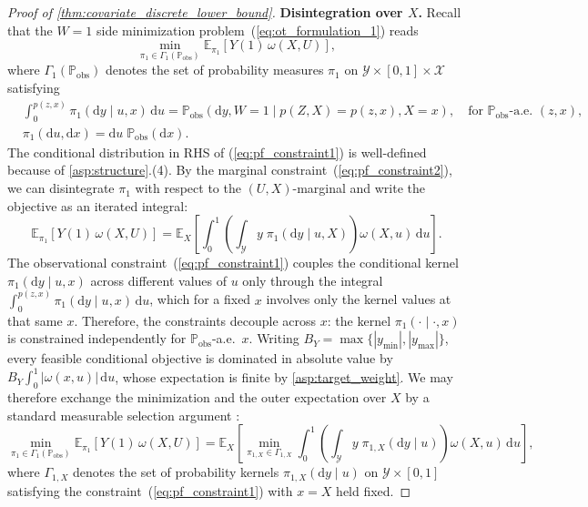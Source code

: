 \begin{proof}[Proof of \cref{thm:covariate_discrete_lower_bound}]
\medskip
\noindent\textbf{Disintegration over $X$.}
Recall that the $W=1$ side minimization problem~(\ref{eq:ot_formulation_1}) reads
\begin{equation*}
    \min_{\pi_1 \in \Gamma_1(\mathbb{P}_{\text{obs}})} \mathbb{E}_{\pi_1}[Y(1)\,\omega(X,U)],
\end{equation*}
where $\Gamma_1(\mathbb{P}_{\text{obs}})$ denotes the set of probability measures $\pi_1$ on $\mathcal{Y} \times [0,1] \times \mathcal{X}$ satisfying
\begin{align}
    &\int_0^{p(z,x)} \pi_1(\mathrm{d}y \mid u, x)\,\mathrm{d}u = \mathbb{P}_{\text{obs}}(\mathrm{d}y, W\!=\!1 \mid p(Z,X)\!=\!p(z,x), X\!=\!x), \quad \text{for } \mathbb{P}_{\text{obs}}\text{-a.e.\ } (z,x), \label{eq:pf_constraint1} \\
    &\pi_1(\mathrm{d}u, \mathrm{d}x) = \mathrm{d}u\;\mathbb{P}_{\text{obs}}(\mathrm{d}x). \label{eq:pf_constraint2}
\end{align}
The conditional distribution in RHS of (\ref{eq:pf_constraint1}) is well-defined because of \cref{asp:structure}.(4). By the marginal constraint~(\ref{eq:pf_constraint2}), we can disintegrate $\pi_1$ with respect to the $(U,X)$-marginal and write the objective as an iterated integral:
\begin{equation}\label{eq:pf_iterated}
    \mathbb{E}_{\pi_1}[Y(1)\,\omega(X,U)] = \mathbb{E}_{X}\left[\int_0^1 \left(\int_{\mathcal{Y}} y\;\pi_1(\mathrm{d}y \mid u, X)\right) \omega(X,u)\,\mathrm{d}u\right].
\end{equation}
The observational constraint~(\ref{eq:pf_constraint1}) couples the conditional kernel $\pi_1(\mathrm{d}y \mid u, x)$ across different values of $u$ only through the integral $\int_0^{p(z,x)} \pi_1(\mathrm{d}y \mid u, x)\,\mathrm{d}u$, which for a fixed $x$ involves only the kernel values at that same $x$. Therefore, the constraints decouple across $x$: the kernel $\pi_1(\cdot \mid \cdot, x)$ is constrained independently for $\mathbb{P}_{\text{obs}}$-a.e.\ $x$. Writing $B_Y=\max\{|y_{\min}|,|y_{\max}|\}$, every feasible conditional objective is dominated in absolute value by $B_Y\int_0^1|\omega(x,u)|\,\mathrm du$, whose expectation is finite by \cref{asp:target_weight}. We may therefore exchange the minimization and the outer expectation over $X$ by a standard measurable selection argument \citep[Proposition 7.50]{bertsekas1996stochastic}:
\begin{equation}\label{eq:pf_exchange}
    \min_{\pi_1 \in \Gamma_1(\mathbb{P}_{\text{obs}})} \mathbb{E}_{\pi_1}[Y(1)\,\omega(X,U)] = \mathbb{E}_{X}\left[\min_{\pi_{1,X} \in \Gamma_{1,X}} \int_0^1 \left(\int_{\mathcal{Y}} y\;\pi_{1,X}(\mathrm{d}y \mid u)\right) \omega(X,u)\,\mathrm{d}u\right],
\end{equation}
where $\Gamma_{1,X}$ denotes the set of probability kernels $\pi_{1,X}(\mathrm{d}y \mid u)$ on $\mathcal{Y} \times [0,1]$ satisfying the constraint~(\ref{eq:pf_constraint1}) with $x = X$ held fixed.


\end{proof}
